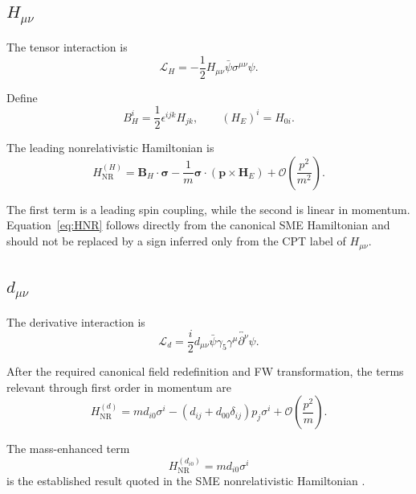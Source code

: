 \documentclass[aps,prd,reprint,superscriptaddress,nofootinbib]{revtex4-2}
\newcommand{\NR}{\mathrm{NR}}
\begin{document}
	\subsection{$H_{\mu\nu}$}
	
	The tensor interaction is
	\begin{equation}
		\mathcal L_H
		=
		-\frac12 H_{\mu\nu}\bar\psi\sigma^{\mu\nu}\psi .
	\end{equation}
	
	Define
	\begin{equation}
		B_H^i
		=
		\frac12\epsilon^{ijk}H_{jk},
		\qquad
		(H_E)^i=H_{0i}.
	\end{equation}
	
	The leading nonrelativistic Hamiltonian is
	\begin{equation}
		H_{\NR}^{(H)}
		=
		\mathbf B_H\cdot\boldsymbol{\sigma}
		-\frac{1}{m}
		\boldsymbol{\sigma}\cdot
		(\mathbf p\times\mathbf H_E)
		+\mathcal O\!\left(\frac{p^2}{m^2}\right).
		\label{eq:HNR}
	\end{equation}
	
	The first term is a leading spin coupling, while the second is
	linear in momentum. Equation~\eqref{eq:HNR} follows directly from the
	canonical SME Hamiltonian and should not be replaced by a sign inferred
	only from the CPT label of $H_{\mu\nu}$.
	
	\subsection{$d_{\mu\nu}$}
	
	The derivative interaction is
	\begin{equation}
		\mathcal L_d
		=
		\frac{i}{2}
		d_{\mu\nu}
		\bar\psi\gamma_5\gamma^\mu
		\overleftrightarrow{\partial^\nu}\psi .
		\label{eq:Ld}
	\end{equation}
	
	After the required canonical field redefinition and FW transformation,
	the terms relevant through first order in momentum are
	\begin{equation}
		H_{\NR}^{(d)}
		=
		m d_{i0}\sigma^i
		-
		\left(
		d_{ij}+d_{00}\delta_{ij}
		\right)p_j\sigma^i
		+\mathcal O\!\left(\frac{p^2}{m}\right).
		\label{eq:dNR}
	\end{equation}
	
	The mass-enhanced term
	\begin{equation}
		H_{\NR}^{(d_{i0})}
		=
		m d_{i0}\sigma^i
		\label{eq:di0}
	\end{equation}
	is the established result quoted in the SME nonrelativistic
	Hamiltonian \cite{KosteleckyLane1999}.
	
\end{document}
